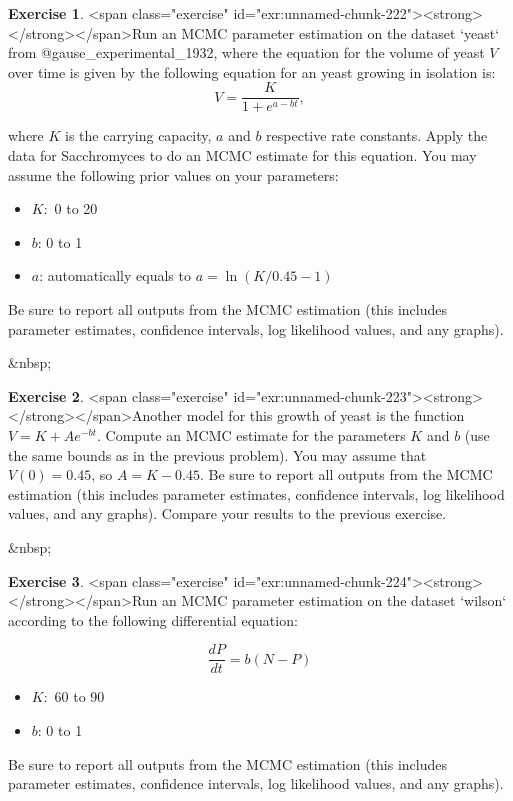 \documentclass[
]{book}
\theoremstyle{definition}
\theoremstyle{definition}
\theoremstyle{definition}
\newtheorem{exercise}{Exercise}[chapter]
\theoremstyle{remark}
\begin{document}
\begin{exercise}
<span class="exercise" id="exr:unnamed-chunk-222"><strong>\label{exr:unnamed-chunk-222} </strong></span>Run an MCMC parameter estimation on the dataset `yeast` from @gause_experimental_1932, where the equation for the volume of yeast $V$ over time is given by the following equation for an yeast growing in isolation is:
\begin{equation}
V = \frac{K}{1+e^{a-bt}},
\end{equation}

where $K$ is the carrying capacity, $a$ and $b$ respective rate constants.  Apply the data for Sacchromyces to do an MCMC estimate for this equation.  You may assume the following prior values on your parameters:

\begin{itemize}
\item $K:$ 0 to 20
\item $b$: 0 to 1
\item $a$: automatically equals to $a = \ln(K/0.45-1)$
\end{itemize}

Be sure to report all outputs from the MCMC estimation (this includes parameter estimates, confidence intervals, log likelihood values, and any graphs).
\end{exercise}

&nbsp;

\begin{exercise}
<span class="exercise" id="exr:unnamed-chunk-223"><strong>\label{exr:unnamed-chunk-223} </strong></span>Another model for this growth of yeast is the function $\displaystyle V= K + Ae^{-bt}$.  Compute an MCMC estimate for the parameters $K$ and $b$ (use the same bounds as in the previous problem).  You may assume that $V(0)=0.45$, so $A = K - 0.45$. Be sure to report all outputs from the MCMC estimation (this includes parameter estimates, confidence intervals, log likelihood values, and any graphs).  Compare your results to the previous exercise.
\end{exercise}

&nbsp;

\begin{exercise}
<span class="exercise" id="exr:unnamed-chunk-224"><strong>\label{exr:unnamed-chunk-224} </strong></span>Run an MCMC parameter estimation on the dataset `wilson` according to the following differential equation:

\begin{equation}
\frac{dP}{dt} = b(N-P)
\end{equation}

\begin{itemize}
\item $K:$ 60 to 90
\item $b$: 0 to 1
\end{itemize}

Be sure to report all outputs from the MCMC estimation (this includes parameter estimates, confidence intervals, log likelihood values, and any graphs).

\end{exercise}
\end{document}

